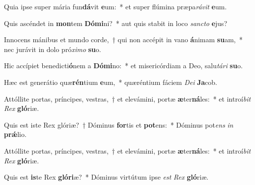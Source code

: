 \item Quia ipse super mária fun\textbf{dá}vit \textbf{e}um:~* et super flúmina præpa\textit{rá}\textit{vit} \textbf{e}um.
\item Quis ascéndet in \textbf{mon}tem \textbf{Dó}\textbf{mi}ni?~* aut quis stabit in loco \textit{sanc}\textit{to} \textbf{e}jus?
\item Innocens mánibus et mundo corde,~† qui non accépit in vano \textbf{á}nimam \textbf{su}am,~* nec jurávit in dolo pró\textit{xi}\textit{mo} \textbf{su}o.
\item Hic accípiet benedicti\textbf{ó}nem a \textbf{Dó}\textbf{mi}no:~* et misericórdiam a Deo, salu\textit{tá}\textit{ri} \textbf{su}o.
\item Hæc est generátio quæ\textbf{rén}tium \textbf{e}um,~* quæréntium fáciem \textit{De}\textit{i} \textbf{Ja}cob.
\item Attóllite portas, príncipes, vestras,~† et elevámini, portæ \textbf{æ}ter\textbf{ná}les:~* et introí\textit{bit} \textit{Rex} \textbf{gló}riæ.
\item Quis est iste Rex glóriæ?~† Dóminus \textbf{for}tis et \textbf{pot}ens:~* Dóminus pot\textit{ens} \textit{in} \textbf{prǽ}lio.
\item Attóllite portas, príncipes, vestras,~† et elevámini, portæ \textbf{æ}ter\textbf{ná}les:~* et introí\textit{bit} \textit{Rex} \textbf{gló}riæ.
\item Quis est \textbf{is}te Rex \textbf{gló}\textbf{ri}æ?~* Dóminus virtútum ipse \textit{est} \textit{Rex} \textbf{gló}riæ.
